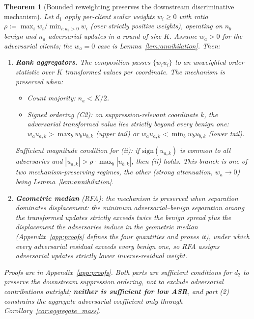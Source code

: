 \documentclass{article}
\newtheorem{theorem}{Theorem}
\begin{document}
\begin{theorem}[Bounded reweighting preserves the downstream discriminative mechanism]
\label{thm:bounded_reweight}
Let $d_1$ apply per-client scalar weights $w_i \geq 0$ with ratio $\rho := \max_i w_i / \min_{i: w_i > 0} w_i$ (over strictly positive weights), operating on $n_b$ benign and $n_a$ adversarial updates in a round of size $K$. Assume $w_a > 0$ for the adversarial clients; the $w_a = 0$ case is Lemma~\ref{lem:annihilation}. Then:
\begin{enumerate}[noitemsep,topsep=2pt]
\item \textbf{Rank aggregators.} The composition passes $\{w_i u_i\}$ to an \emph{unweighted} order statistic over $K$ transformed values per coordinate. The mechanism is preserved when:
\begin{itemize}[noitemsep]
\item[(i)] \emph{Count majority:} $n_a < K/2$.
\item[(ii)] \emph{Signed ordering (C2):} on suppression-relevant coordinate $k$, the adversarial transformed value lies strictly beyond every benign one: $w_a u_{a,k} > \max_b w_b u_{b,k}$ (upper tail) or $w_a u_{a,k} < \min_b w_b u_{b,k}$ (lower tail).
\end{itemize}
\emph{Sufficient magnitude condition for} (ii): if $\mathrm{sign}(u_{a,k})$ is common to all adversaries and $|u_{a,k}| > \rho \cdot \max_b |u_{b,k}|$, then (ii) holds. This branch is one of two mechanism-preserving regimes, the other (strong attenuation, $w_a \to 0$) being Lemma~\ref{lem:annihilation}.
\item \textbf{Geometric median} (RFA): the mechanism is preserved when \emph{separation dominates displacement}: the minimum adversarial--benign separation among the transformed updates strictly exceeds twice the benign spread plus the displacement the adversaries induce in the geometric median (Appendix~\ref{app:proofs} defines the four quantities and proves it), under which every adversarial residual exceeds every benign one, so RFA assigns adversarial updates strictly lower inverse-residual weight.
\end{enumerate}
Proofs are in Appendix~\ref{app:proofs}. Both parts are sufficient conditions for $d_2$ to \emph{preserve the downstream suppression ordering}, not to exclude adversarial contributions outright; \textbf{neither is sufficient for low ASR}, and part (2) constrains the \emph{aggregate} adversarial coefficient only through Corollary~\ref{cor:aggregate_mass}.
\end{theorem}
\end{document}
